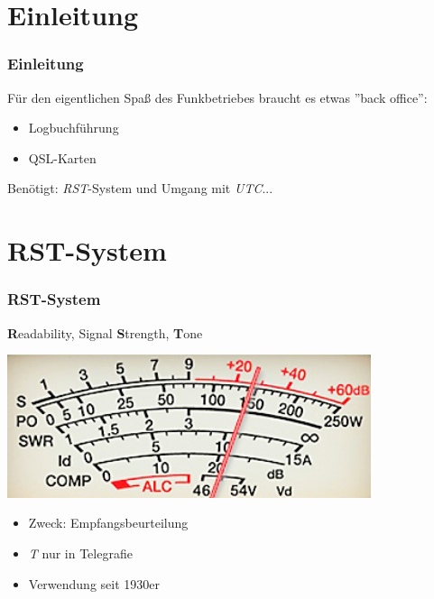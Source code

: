 

\subtitle{Betriebstechnik/Vorschriften 13: \\
          RST-System, UTC, Logbuch, QSL-Karte \\[2em]}
\date{Stand 29.01.2015}


\section{Einleitung}

\begin{frame}
    \frametitle{Einleitung}

    Für den eigentlichen Spaß des Funkbetriebes braucht es etwas ''back
    office'': 

    \begin{itemize}
        \item Logbuchführung
        \item QSL-Karten
    \end{itemize}

    \vspace{1cm}

    Benötigt: \emph{RST}-System und Umgang mit \emph{UTC}...

\end{frame}

\section{RST-System}

\begin{frame}
    \frametitle{RST-System}

    \textbf{R}eadability, Signal \textbf{S}trength, \textbf{T}one

    \begin{center}
        \includegraphics[width=0.8\textwidth]{e10/S-Meter.jpg}
        \tiny \hyperlink{refs}{\cite{wc}}
    \end{center}

    \begin{itemize}
        \item Zweck: Empfangsbeurteilung
        \item \emph{T} nur in Telegrafie
        \item Verwendung seit 1930er
    \end{itemize}

\end{frame}

